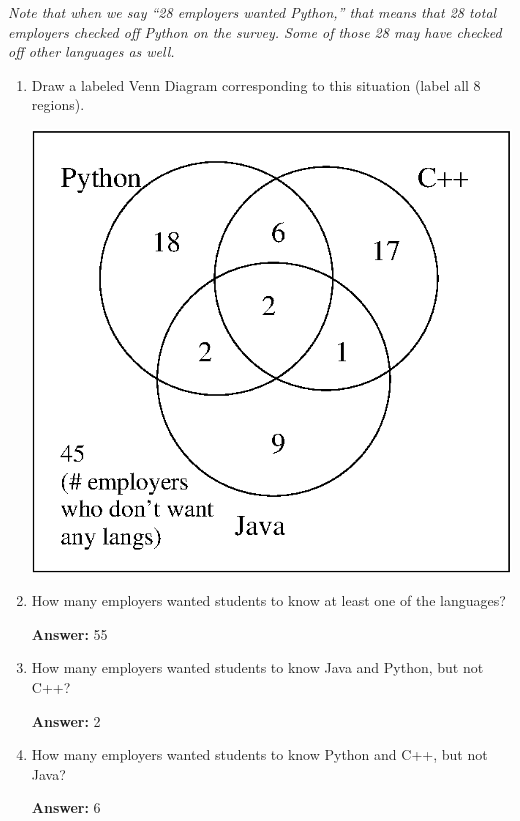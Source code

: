 \documentclass[11pt, letterpaper]{report}
\begin{document}
\begin{enumerate}
\emph{Note that when we say ``28 employers wanted Python,'' that means that 28 total employers checked off Python
on the survey.  Some of those 28 may have checked off other languages as well.}

\begin{enumerate}

        \item Draw a labeled Venn Diagram corresponding to this situation (label all 8 regions).
        
        \includegraphics[scale=0.8]{hw12venn}
        
        \item How many employers wanted students to know at least one of the languages?
        
        \textbf{Answer:} 55
        
        \item How many employers wanted students to know Java and Python, but not C++?
        
        \textbf{Answer:} 2
        
        \item How many employers wanted students to know Python and C++, but not Java?
        
        \textbf{Answer:} 6
\end{enumerate}


\end{enumerate}
\end{document}

